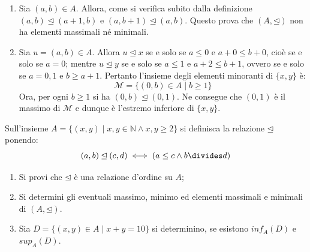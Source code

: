 \begin{enumerate}
\begin{itemize}
	\end{itemize}
	\item Sia $(a,b) \in A$. Allora, come si verifica subito dalla definizione $(a,b) \unlhd (a+1,b)$ e $(a,b+1) \unlhd (a,b)$. Questo prova che $(A,\unlhd)$ non ha elementi massimali né minimali.
	\item Sia $u=(a,b) \in A$. Allora $u \unlhd x$ se e solo se $a \leq 0$ e $a+0 \leq b+0$, cioè se e solo se $a=0$; mentre $u \unlhd y$ se e solo se $a \leq 1$ e $a+2 \leq b+1$, ovvero se e solo se $a=0,1$ e $b \geq a+1$. Pertanto l'insieme degli elementi minoranti di $\{x,y\}$ è:
	\begin{displaymath}
		\mathcal{M} = \{(0,b) \in A \; | \; b \geq 1\}
	\end{displaymath}
	Ora, per ogni $b \geq 1$ si ha $(0,b) \unlhd (0,1)$. Ne consegue che $(0,1)$ è il massimo di $\mathcal{M}$ e dunque è l'estremo inferiore di $\{x,y\}$.
	\begin{flushright}
		\blacksquare
	\end{flushright}
\end{enumerate}

\begin{exsbox}
	Sull'insieme $A = \{(x,y) \; | \; x,y \in \mathbb{N} \land x,y \geq 2\}$ si definisca la relazione $\unlhd$ ponendo:
	\begin{displaymath}
		(a,b) \unlhd (c,d) \iff (a \leq c \land b \divides d)
	\end{displaymath}
	\begin{enumerate}
		\item Si provi che $\unlhd$ è una relazione d'ordine su $A$;
		\item Si determini gli eventuali massimo, minimo ed elementi massimali e minimali di $(A,\unlhd)$.
		\item Sia $D=\{(x,y) \in A \; | \; x+y=10\}$ si determinino, se esistono $inf_{A}(D)$ e $sup_{A}(D)$.
	\end{enumerate}
\end{exsbox}

